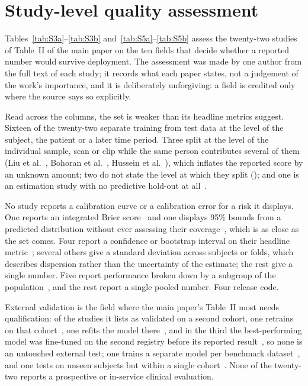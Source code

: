 \documentclass[journal]{IEEEtran}
\begin{document}
\section{Study-level quality assessment}
\label{sec:quality}
Tables~\ref{tab:S3a}--\ref{tab:S3b} and~\ref{tab:S5a}--\ref{tab:S5b} assess the twenty-two studies of
Table~II of the main paper on the ten fields that decide whether a reported number would survive
deployment. The assessment was made by one author from the full text of each
study; it records what each paper states, not a judgement of the work's
importance, and it is deliberately unforgiving: a field is credited only where
the source says so explicitly.

Read across the columns, the set is weaker than its headline metrics suggest.
Sixteen of the twenty-two separate training from test data at the level of the
subject, the patient or a later time period. Three split at the level of the
individual sample, scan or clip while the same person contributes several of
them (Liu et al.~\cite{2}, Bohoran et al.~\cite{5}, Hussein et
al.~\cite{hussein2022seizure}), which inflates the reported score by an unknown
amount; two do not state the level at which they split
(\cite{liu2025sleepposture,zhu2024ippg}); and one is an estimation study with no
predictive hold-out at all~\cite{XiaoLi2016DiabetesSpatiotemporal}.

No study reports a calibration curve or a calibration error for a risk it
displays. One reports an integrated Brier score~\cite{lin2022deep} and one
displays 95\% bounds from a predicted distribution without ever assessing
their coverage~\cite{Li2020GluNet}, which is as close as the set comes. Four
report a confidence or bootstrap interval on their headline
metric~\cite{XiaoLi2016DiabetesSpatiotemporal,lin2022deep,nitski2021long,glaser2022deep};
several others give a standard deviation across subjects or folds, which
describes dispersion rather than the uncertainty of the estimate; the rest give
a single number. Five report performance broken down by a subgroup of the
population~\cite{nitski2021long,glaser2022deep,liu2024cignn,herath2026parkinson,chan2026sitstand},
and the rest report a single pooled number. Four release code.

External validation is the field where the main paper's Table~II most needs
qualification: of the studies it lists as validated on a second cohort, one
retrains on that cohort~\cite{2}, one refits the model
there~\cite{lin2022deep}, and in the third the best-performing model was
fine-tuned on the second registry before its reported
result~\cite{nitski2021long}, so none is an untouched external test; one trains
a separate model per benchmark dataset~\cite{hussein2022seizure}, and one tests
on unseen subjects but within a single cohort~\cite{Li2020GluNet}. None of the
twenty-two reports a prospective or in-service clinical evaluation.
\end{document}
